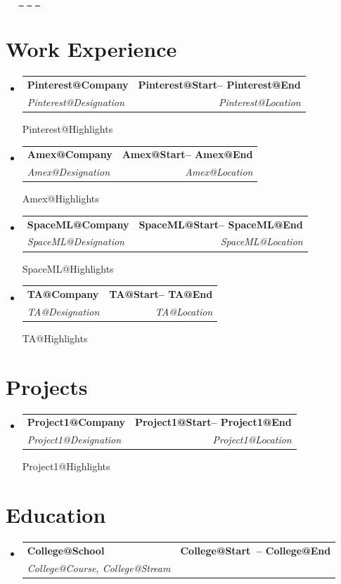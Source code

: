 \documentclass[letterpaper,11pt]{article}
\makeatletter
\newcommand{\resumeSubheading}[4]{
  \vspace{-2pt}\item
    \begin{tabular*}{1.0\textwidth}[t]{l@{\extracolsep{\fill}}r}
      \textbf{#1} & \textbf{\small #2} \\
      \textit{\small#3} & \textit{\small #4} \\
    \end{tabular*}\vspace{-7pt}
}
\newcommand{\resumeProjectHeading}[2]{
    \item
    \begin{tabular*}{1.001\textwidth}{l@{\extracolsep{\fill}}r}
      \small#1 & \textbf{\small #2}\\
    \end{tabular*}\vspace{-7pt}
}
\newcommand{\resumeSubHeadingListStart}{\begin{itemize}[leftmargin=0.0in, label={}]}
\newcommand{\resumeSubHeadingListEnd}{\end{itemize}}
\def\titlesection{
\begin{center}
    {\Huge \scshape \firstname \ \lastname} \\ \vspace{1pt}
    \small \raisebox{-0.1\height}\faPhone\ \jasphone ~ \href{mailto:\email}{\raisebox{-0.2\height}\faEnvelope\  \underline{\email}}
    \href{\linkedinurl}{\raisebox{-0.2\height}\faLinkedin\ \underline{\linkedintext}}
    \href{\githuburl}{\raisebox{-0.2\height}\faGithub\ \underline{\githubtext}}
    \vspace{-8pt}
\end{center}
}
\makeatother
\begin{document}
\titlesection

\newcommand{\renderExp}[1]{
\resumeSubheading
      {\csname #1@Company\endcsname}{\csname #1@Start\endcsname -- \csname #1@End\endcsname}
      {\csname #1@Designation\endcsname}{\csname #1@Location\endcsname}
      \csname #1@Highlights\endcsname
}

\section{Work Experience}
    \resumeSubHeadingListStart
        \renderExp{Pinterest}
        \renderExp{Amex}
        \renderExp{SpaceML}
        \renderExp{TA}
  \resumeSubHeadingListEnd

\section{Projects}
\resumeSubHeadingListStart
    \renderExp{Project1}
\resumeSubHeadingListEnd

\section{Education}
  \resumeSubHeadingListStart
      \resumeSubheading{\csname College@School\endcsname}
      {\csname College@Start\endcsname \ -- \csname College@End\endcsname}
      {\csname College@Course\endcsname, \csname College@Stream\endcsname}{}
  \resumeSubHeadingListEnd

\newcommand{\renderHck}[1]{
      \resumeProjectHeading
      {\textbf{\csname #1@Title\endcsname} $|$ \csname #1@Position\endcsname}
      {\csname #1@Date\endcsname}
      \csname #1@Highlights\endcsname
}
\end{document}
